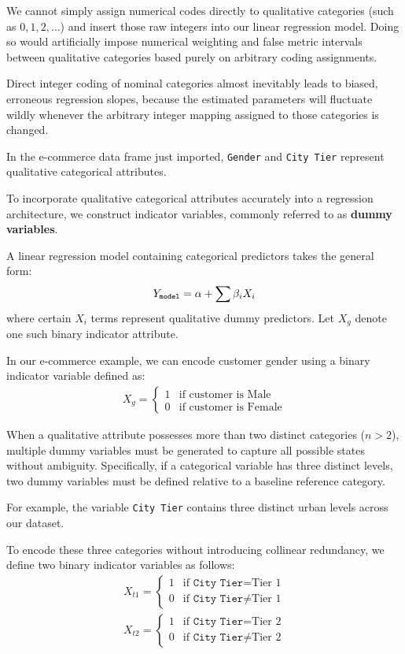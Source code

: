 We cannot simply assign numerical codes directly to qualitative categories (such as $0, 1, 2, \dots$) and insert those raw integers into our linear regression model. Doing so would artificially impose numerical weighting and false metric intervals between qualitative categories based purely on arbitrary coding assignments.

Direct integer coding of nominal categories almost inevitably leads to biased, erroneous regression slopes, because the estimated parameters will fluctuate wildly whenever the arbitrary integer mapping assigned to those categories is changed.

In the e-commerce data frame just imported, \texttt{Gender} and \texttt{City Tier} represent qualitative categorical attributes.

To incorporate qualitative categorical attributes accurately into a regression architecture, we construct indicator variables, commonly referred to as \textbf{dummy variables}.

A linear regression model containing categorical predictors takes the general form:
\begin{align}
	Y_{\texttt{model}} = \alpha + \sum \beta_{i} X_{i}
\end{align}
where certain $X_{i}$ terms represent qualitative dummy predictors. Let $X_{g}$ denote one such binary indicator attribute.

In our e-commerce example, we can encode customer gender using a binary indicator variable defined as:
\begin{align}
	X_{g} =
	\begin{cases}
		1 & \text{if customer is Male} \\
		0 & \text{if customer is Female}
	\end{cases}
\end{align}

When a qualitative attribute possesses more than two distinct categories ($n > 2$), multiple dummy variables must be generated to capture all possible states without ambiguity. Specifically, if a categorical variable has three distinct levels, two dummy variables must be defined relative to a baseline reference category.

For example, the variable \texttt{City Tier} contains three distinct urban levels across our dataset.

To encode these three categories without introducing collinear redundancy, we define two binary indicator variables as follows:
\begin{align}
	X_{t1} =
	\begin{cases}
		1 & \text{if } \texttt{City Tier} = \text{Tier 1} \\
		0 & \text{if } \texttt{City Tier} \neq \text{Tier 1}
	\end{cases}
\end{align}
\begin{align}
	X_{t2} =
	\begin{cases}
		1 & \text{if } \texttt{City Tier} = \text{Tier 2} \\
		0 & \text{if } \texttt{City Tier} \neq \text{Tier 2}
	\end{cases}
\end{align}

